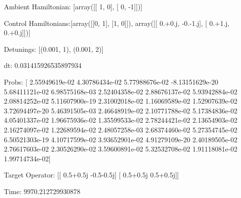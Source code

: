 \documentclass{article}
\begin{document}
    

\newpage

Ambient Hamiltonian: [array([[ 1,  0],
       [ 0, -1]])]

Control Hamiltonians:[array([[0, 1],
       [1, 0]]), array([[ 0.+0.j, -0.-1.j],
       [ 0.+1.j,  0.+0.j]])]

Detunings: [(0.001, 1), (0.001, 2)]

 dt: 0.031415926535897934

Probs: [  2.55949619e-02   4.30786434e-02   5.77988676e-02  -8.13151629e-20
   5.68411121e-02   6.98575168e-03   2.52404358e-02   2.88676137e-02
   5.93942884e-02   2.08814252e-02   5.11607900e-19   2.31002018e-02
   1.16069589e-02   1.52907639e-02   3.72694497e-20   5.46391505e-03
   2.46648919e-02   2.10771788e-02   5.17384836e-02   4.05401337e-02
   1.96675936e-02   1.35599533e-02   2.78244421e-02   2.13654903e-02
   2.16274097e-02   1.22689594e-02   2.48057258e-03   2.68374460e-02
   5.27354745e-02   6.50521303e-19   4.10717599e-02   3.93652901e-02
   4.91279109e-20   2.40189505e-02   2.76617603e-02   2.30526290e-02
   3.59600891e-02   5.32532708e-02   1.91118081e-02   1.99714734e-02]

Target Operator: [[ 0.5+0.5j -0.5-0.5j]
 [ 0.5+0.5j  0.5+0.5j]]

Time: 9970.212729930878
\end{document}
